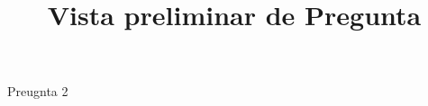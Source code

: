 \documentclass[a4paper,10pt]{article}\usepackage[utf8]{inputenc}\usepackage[spanish]{babel}\usepackage{arial}
\title{Vista preliminar de Pregunta}
\begin{document}
\twocolumn 

\maketitle

Preugnta 2
\end{document}
